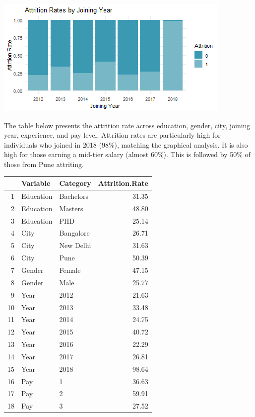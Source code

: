 \documentclass[11pt,preprint, authoryear]{elsarticle}
\let\origfigure\figure
\let\endorigfigure\endfigure
\renewenvironment{figure}[1][2] {
    \expandafter\origfigure\expandafter[H]
} {
    \endorigfigure
}
\let\origtable\table
\let\endorigtable\endtable
\renewenvironment{table}[1][2] {
    \expandafter\origtable\expandafter[H]
} {
    \endorigtable
}
\numberwithin{equation}{section}
\numberwithin{figure}{section}
\numberwithin{table}{section}
\begin{document}
\begin{figure}[H]

{\centering \includegraphics{Final_project_files/figure-latex/Figure7-1} 

}

\caption{Attrition by Joining Year \label{Figure7}}\label{fig:Figure7}
\end{figure}

The table below presents the attrition rate across education, gender,
city, joining year, experience, and pay level. Attrition rates are
particularly high for individuals who joined in 2018 (98\%), matching
the graphical analysis. It is also high for those earning a mid-tier
salary (almost 60\%). This is followed by 50\% of those from Pune
attriting.

\begin{table}[H]
\centering
\begin{tabular}{rllr}
  \hline
 & Variable & Category & Attrition.Rate \\ 
  \hline
1 & Education & Bachelors & 31.35 \\ 
  2 & Education & Masters & 48.80 \\ 
  3 & Education & PHD & 25.14 \\ 
  4 & City & Bangalore & 26.71 \\ 
  5 & City & New Delhi & 31.63 \\ 
  6 & City & Pune & 50.39 \\ 
  7 & Gender & Female & 47.15 \\ 
  8 & Gender & Male & 25.77 \\ 
  9 & Year & 2012 & 21.63 \\ 
  10 & Year & 2013 & 33.48 \\ 
  11 & Year & 2014 & 24.75 \\ 
  12 & Year & 2015 & 40.72 \\ 
  13 & Year & 2016 & 22.29 \\ 
  14 & Year & 2017 & 26.81 \\ 
  15 & Year & 2018 & 98.64 \\ 
  16 & Pay & 1 & 36.63 \\ 
  17 & Pay & 2 & 59.91 \\ 
  18 & Pay & 3 & 27.52 \\ 
   \hline
\end{tabular}
\caption{Attrition Rate Across Categories \label{tab1}} 
\end{table}
\end{document}
